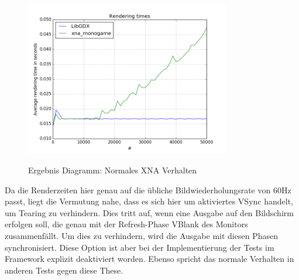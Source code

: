 \begin{figure}
\caption{Ergebnis Diagramm: Normales XNA Verhalten}
\centering
\includegraphics[width=0.8\textwidth]{xna_normal}
\label{dia:xna_normal}
\end{figure}
Da die Renderzeiten hier genau auf die übliche Bildwiederholungsrate von 60Hz passt, liegt die Vermutung nahe, dass es sich hier um aktiviertes VSync handelt, um Tearing zu verhindern. Dies tritt auf, wenn eine Ausgabe auf den Bildschirm erfolgen soll, die genau mit der Refresh-Phase VBlank des Monitors zusammenfällt. Um dies zu verhindern, wird die Ausgabe mit diesen Phasen synchronisiert. Diese Option ist aber bei der Implementierung der Tests im Framework explizit deaktiviert worden. Ebenso spricht das normale Verhalten in anderen Tests gegen diese These.

